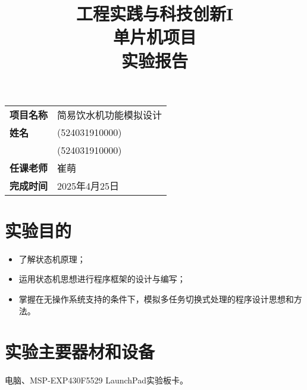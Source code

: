 \documentclass{article}
\title{工程实践与科技创新I\\单片机项目\\\Huge\textbf{实验报告}}
\author{}
\date{}
\newenvironment{itemlist}{
    \begin{itemize}[itemsep=0pt,topsep=1em,parsep=0pt,leftmargin=2em,labelsep=1em,itemindent=2em] 
}{
    \end{itemize}
}
\renewcommand{\footrulewidth}{0.5pt}
\renewcommand{\footrulewidth}{0.5pt}
\begin{document}
\maketitle
\thispagestyle{titlepage}
\fancyhead{}
\begin{table}
    \large
    \centering
    \begin{tabular}{ll}
        \textbf{项目名称} & 简易饮水机功能模拟设计\\
        \textbf{姓名} & (524031910000)\\
         & (524031910000)\\
        \textbf{任课老师} & 崔萌\\
        \textbf{完成时间} & 2025年4月25日\\
    \end{tabular}
\end{table}
\clearpage

\thispagestyle{toc}
\fancyhead{}
\tableofcontents
\clearpage

\pagestyle{fancy}
\fancyhead{}
\renewcommand{\footrulewidth}{0.5pt}
\section{实验目的}
\begin{itemlist}
    \item 了解状态机原理；
    \item 运用状态机思想进行程序框架的设计与编写；
    \item 掌握在无操作系统支持的条件下，模拟多任务切换式处理的程序设计思想和方法。
\end{itemlist}
\section{实验主要器材和设备}
电脑、MSP-EXP430F5529 LaunchPad实验板卡。
\end{document}

